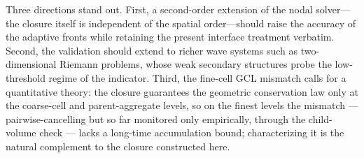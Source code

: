 \documentclass[a4paper]{cas-sc}
\begin{document}
Three directions stand out. First, a second-order extension of the
nodal solver---the closure itself is independent of the spatial order---should
raise the accuracy of the adaptive fronts while retaining the present
interface treatment verbatim. Second,
the validation should extend to richer wave systems such as
two-dimensional Riemann problems, whose weak secondary structures
probe the low-threshold regime of the indicator. Third, the fine-cell GCL mismatch calls for a quantitative
theory: the closure guarantees the geometric conservation law only at
the coarse-cell and parent-aggregate levels, so on the finest levels
the mismatch --- pairwise-cancelling but so far monitored only
empirically, through the child-volume check --- lacks a long-time
accumulation bound;
characterizing it is the natural complement to the closure
constructed here.



\end{document}
